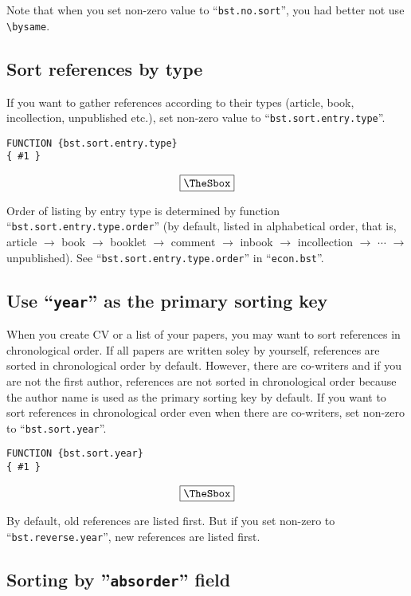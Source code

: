 \documentclass[10pt]{article}
\newenvironment{Frame}%
{\setlength{\fboxsep}{15pt}
\setlength{\mylength}{\linewidth}%
\addtolength{\mylength}{-2\fboxsep}%
\addtolength{\mylength}{-2\fboxrule}%
\Sbox
\minipage{\mylength}%
\setlength{\abovedisplayskip}{0pt}%
\setlength{\belowdisplayskip}{0pt}%
}%
{\endminipage\endSbox
\[\fbox{\TheSbox}\]}
\begin{document}
Note that when you set non-zero value to ``\texttt{bst.no.sort}'', you had better not
use \verb|\bysame|.

\subsection{Sort references by type}

If you want to gather references according to their types (article,
book, incollection, unpublished etc.), set non-zero value to
``\texttt{bst.sort.entry.type}''.
\begin{Frame}
\begin{verbatim}
FUNCTION {bst.sort.entry.type}
{ #1 }
\end{verbatim}
\end{Frame}

Order of listing by entry type is determined by function
``\texttt{bst.sort.entry.type.order}'' (by default, listed in alphabetical
order, that is, article $\rightarrow$ book $\rightarrow$ booklet
$\rightarrow$ comment $\rightarrow$ inbook $\rightarrow$ incollection
$\rightarrow$ $\cdots$ $\rightarrow$ unpublished).  See
``\texttt{bst.sort.entry.type.order}'' in ``\texttt{econ.bst}''.

\subsection{Use ``\texttt{year}''  as the primary sorting key}

When you create CV or a list of your papers, you may want to sort
references in chronological order.  If all papers are written soley by
yourself, references are sorted in chronological order by default.
However, there are co-writers and if you are not the first author,
references are not sorted in chronological order because the author name
is used as the primary sorting key by default.
If you want to sort references in chronological order even when
there are co-writers, set non-zero to ``\texttt{bst.sort.year}''.
\begin{Frame}
\begin{verbatim}
FUNCTION {bst.sort.year}
{ #1 }
\end{verbatim}
\end{Frame}

By default, old references are listed first.  But if you set non-zero to
``\texttt{bst.reverse.year}'', new references are listed first.

\subsection{Sorting by ''\texttt{absorder}'' field}
\end{document}
